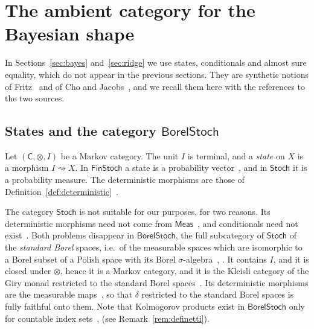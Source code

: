 \documentclass[11pt,a4paper]{article}
\theoremstyle{plain}
\theoremstyle{definition}
\theoremstyle{remark}
\newcommand{\cat}[1]{\mathsf{#1}}
\newcommand{\Meas}{\cat{Meas}}
\newcommand{\Stoch}{\cat{Stoch}}
\newcommand{\FinStoch}{\cat{FinStoch}}
\newcommand{\del}{\delta}
\newcommand{\BorelStoch}{\cat{BorelStoch}}
\begin{document}
\section{The ambient category for the Bayesian shape}\label{sec:ambient}

In Sections~\ref{sec:bayes} and~\ref{sec:ridge} we use states, conditionals and
almost sure equality, which do not appear in the previous sections. They are
synthetic notions of Fritz~\cite{fritz_synthetic_2020} and of Cho and
Jacobs~\cite{cho_disintegration_2019}, and we recall them here with the
references to the two sources.

\subsection{States and the category \texorpdfstring{$\BorelStoch$}{BorelStoch}}

Let $(\cat C,\otimes,I)$ be a Markov category. The unit $I$ is terminal, and a
\emph{state} on $X$ is a morphism $I \rightsquigarrow X$. In $\FinStoch$ a
state is a probability vector~\cite[Ex.~2.5]{fritz_synthetic_2020}, and in
$\Stoch$ it is a probability measure. The deterministic morphisms are those of
Definition~\ref{def:deterministic}~\cite[Def.~10.1]{fritz_synthetic_2020}.

The category $\Stoch$ is not suitable for our purposes, for two reasons. Its
deterministic morphisms need not come from
$\Meas$~\cite[Ex.~10.4]{fritz_synthetic_2020}, and conditionals need not
exist~\cite[Ex.~11.3]{fritz_synthetic_2020}. Both problems disappear in
$\BorelStoch$, the full subcategory of $\Stoch$ of the \emph{standard Borel}
spaces, i.e.\ of the measurable spaces which are isomorphic to a Borel subset
of a Polish space with its Borel
$\sigma$-algebra~\cite[p.~21]{fritz_synthetic_2020},
\cite[p.~12]{cho_disintegration_2019}. It contains $I$, and it is closed under
$\otimes$, hence it is a Markov category, and it is the Kleisli category of the
Giry monad restricted to the standard Borel
spaces~\cite[p.~12]{cho_disintegration_2019}. Its deterministic morphisms are
the measurable maps~\cite[Ex.~10.5]{fritz_synthetic_2020}, so that $\del$
restricted to the standard Borel spaces is fully faithful onto them. Note that
Kolmogorov products exist in $\BorelStoch$ only for countable index
sets~\cite[p.~21]{fritz_synthetic_2020},
\cite[Ex.~3.6]{fritz_rischel_infinite_2020} (see
Remark~\ref{rem:definetti}).
\end{document}
